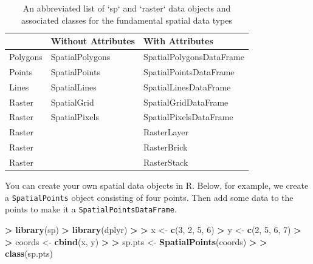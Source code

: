\documentclass[]{krantz}
\makeatletter
\newenvironment{Shaded}{\begin{snugshade}}{\end{snugshade}}
\newcommand{\DecValTok}[1]{\textcolor[rgb]{0.06,0.06,0.06}{#1}}
\newcommand{\ErrorTok}[1]{\textcolor[rgb]{0.14,0.14,0.14}{\textbf{#1}}}
\newcommand{\KeywordTok}[1]{\textcolor[rgb]{0.27,0.27,0.27}{\textbf{#1}}}
\newcommand{\NormalTok}[1]{#1}
\newcommand{\OperatorTok}[1]{\textcolor[rgb]{0.43,0.43,0.43}{\textbf{#1}}}
\newcommand{\StringTok}[1]{\textcolor[rgb]{0.5,0.5,0.5}{#1}}
\newenvironment{kframe}{%
\medskip{}
\setlength{\fboxsep}{.8em}
 \def\at@end@of@kframe{}%
 \ifinner\ifhmode%
  \def\at@end@of@kframe{\end{minipage}}%
  \begin{minipage}{\columnwidth}%
 \fi\fi%
 \def\FrameCommand##1{\hskip\@totalleftmargin \hskip-\fboxsep
 \colorbox{shadecolor}{##1}\hskip-\fboxsep
     \hskip-\linewidth \hskip-\@totalleftmargin \hskip\columnwidth}%
 \MakeFramed {\advance\hsize-\width
   \@totalleftmargin\z@ \linewidth\hsize
   \@setminipage}}%
 {\par\unskip\endMakeFramed%
 \at@end@of@kframe}
\renewenvironment{Shaded}{\begin{kframe}}{\end{kframe}}
\makeatother
\begin{document}
\begin{table}[t]

\caption{\label{tab:spatialObjs}An abbreviated list of `sp` and `raster` data objects and associated classes for the fundamental spatial data types}
\centering
\begin{tabular}{lll}
\toprule
 & Without Attributes & With Attributes\\
\midrule
Polygons & SpatialPolygons & SpatialPolygonsDataFrame\\
Points & SpatialPoints & SpatialPointsDataFrame\\
Lines & SpatialLines & SpatialLinesDataFrame\\
Raster & SpatialGrid & SpatialGridDataFrame\\
Raster & SpatialPixels & SpatialPixelsDataFrame\\
\addlinespace
Raster &  & RasterLayer\\
Raster &  & RasterBrick\\
Raster &  & RasterStack\\
\bottomrule
\end{tabular}
\end{table}

You can create your own spatial data objects in R. Below, for example, we create a \texttt{SpatialPoints} object consisting of four points. Then add some data to the points to make it a \texttt{SpatialPointsDataFrame}.

\begin{Shaded}
\begin{Highlighting}[]
\OperatorTok{>}\StringTok{ }\KeywordTok{library}\NormalTok{(sp)}
\OperatorTok{>}\StringTok{ }\KeywordTok{library}\NormalTok{(dplyr)}
\OperatorTok{>}\StringTok{ }
\ErrorTok{>}\StringTok{ }\NormalTok{x <-}\StringTok{ }\KeywordTok{c}\NormalTok{(}\DecValTok{3}\NormalTok{, }\DecValTok{2}\NormalTok{, }\DecValTok{5}\NormalTok{, }\DecValTok{6}\NormalTok{)}
\OperatorTok{>}\StringTok{ }\NormalTok{y <-}\StringTok{ }\KeywordTok{c}\NormalTok{(}\DecValTok{2}\NormalTok{, }\DecValTok{5}\NormalTok{, }\DecValTok{6}\NormalTok{, }\DecValTok{7}\NormalTok{)}
\OperatorTok{>}\StringTok{ }
\ErrorTok{>}\StringTok{ }\NormalTok{coords <-}\StringTok{ }\KeywordTok{cbind}\NormalTok{(x, y)}
\OperatorTok{>}\StringTok{ }
\ErrorTok{>}\StringTok{ }\NormalTok{sp.pts <-}\StringTok{ }\KeywordTok{SpatialPoints}\NormalTok{(coords)}
\OperatorTok{>}\StringTok{ }
\ErrorTok{>}\StringTok{ }\KeywordTok{class}\NormalTok{(sp.pts)}
\end{Highlighting}
\end{Shaded}
\end{document}
